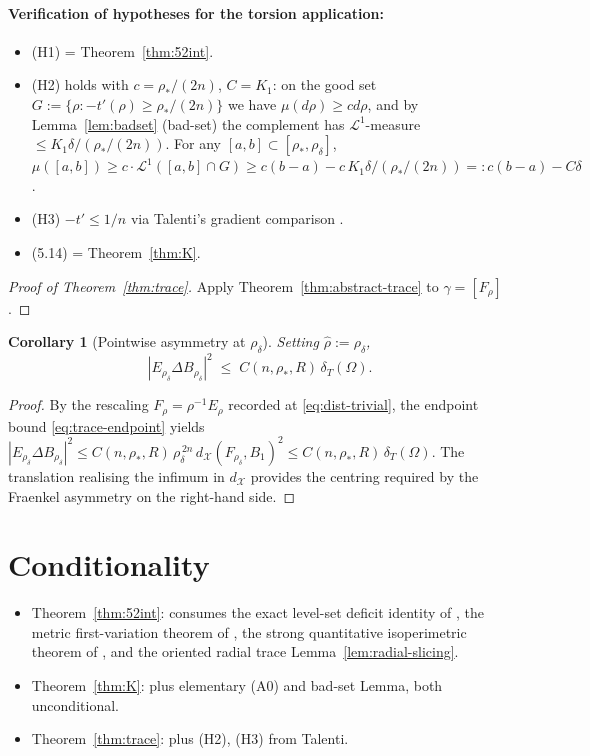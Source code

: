 \documentclass[11pt]{article}
\newtheorem{corollary}[theorem]{Corollary}
\theoremstyle{definition}
\newcommand{\Om}{\Omega}
\newcommand{\rstar}{\rho_{*}}
\newcommand{\rhad}{\widehat\rho}
\newcommand{\X}{\mathcal X}
\begin{document}
\paragraph{Verification of hypotheses for the torsion application:}
\begin{itemize}
\item (H1) = Theorem~\ref{thm:52int}.
\item (H2) holds with $c=\rstar/(2n)$, $C=K_1$: on the good set
$G:=\{\rho:-t'(\rho)\ge\rstar/(2n)\}$ we have $\mu(d\rho)\ge cd\rho$,
and by Lemma~\ref{lem:badset} (bad-set) the complement has
$\mathcal L^1$-measure $\le K_1\delta/(\rstar/(2n))$.  For any
$[a,b]\subset[\rstar,\rho_\delta]$,
$\mu([a,b])\ge c\cdot\mathcal L^1([a,b]\cap G)\ge c(b-a)-c\,K_1\delta/(\rstar/(2n))
=:c(b-a)-C\delta$.
\item (H3) $-t'\le 1/n$ via Talenti's gradient comparison
\cite[Prop.~7.3, Step~5]{LevelSetIdentity}.
\item (5.14) = Theorem~\ref{thm:K}.
\end{itemize}

\begin{proof}[Proof of Theorem~\ref{thm:trace}]
Apply Theorem~\ref{thm:abstract-trace} to $\gamma=[F_\rho]$.
\end{proof}

\begin{corollary}[Pointwise asymmetry at $\rho_\delta$]\label{cor:pointwise-asymmetry}
Setting $\rhad:=\rho_\delta$,
\[
   |E_{\rho_\delta}\Delta B_{\rho_\delta}|^2 \;\le\; C(n,\rstar,R)\,\delta_T(\Om).
\]
\end{corollary}

\begin{proof}
By the rescaling $F_\rho=\rho^{-1}E_\rho$ recorded at
\eqref{eq:dist-trivial}, the endpoint bound \eqref{eq:trace-endpoint}
yields
$|E_{\rho_\delta}\Delta B_{\rho_\delta}|^2\le C(n,\rstar,R)\,\rho_\delta^{\,2n}\,
d_\X(F_{\rho_\delta},B_1)^2\le C(n,\rstar,R)\,\delta_T(\Om)$.
The translation realising the infimum in $d_\X$ provides the centring
required by the Fraenkel asymmetry on the right-hand side.
\end{proof}

\section{Conditionality}\label{sec:cond}

\begin{itemize}
\item Theorem~\ref{thm:52int}: consumes the exact level-set deficit
identity of \cite{LevelSetIdentity}, the metric first-variation theorem
of \cite{MetricFramework}, the strong quantitative isoperimetric theorem
of \cite{FJ2014}, and the oriented radial trace Lemma~\ref{lem:radial-slicing}.
\item Theorem~\ref{thm:K}: plus elementary (A0) and bad-set Lemma,
both unconditional.
\item Theorem~\ref{thm:trace}: plus (H2), (H3) from Talenti.
\end{itemize}
\end{document}
